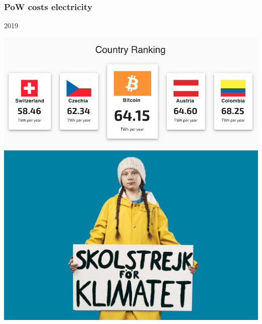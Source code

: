 \documentclass[11pt]{beamer}  %
\begin{document}
\begin{frame}\frametitle{PoW costs electricity}

  \begin{greenbox}{2019}
    \begin{center}
      \includegraphics[scale=0.17,clip=false]{pictures/bitcoin-consumption.jpg}
      \includegraphics[scale=0.14,clip=false]{pictures/greta.jpg}
    \end{center}
  \end{greenbox}
    
\end{frame}
\end{document}
